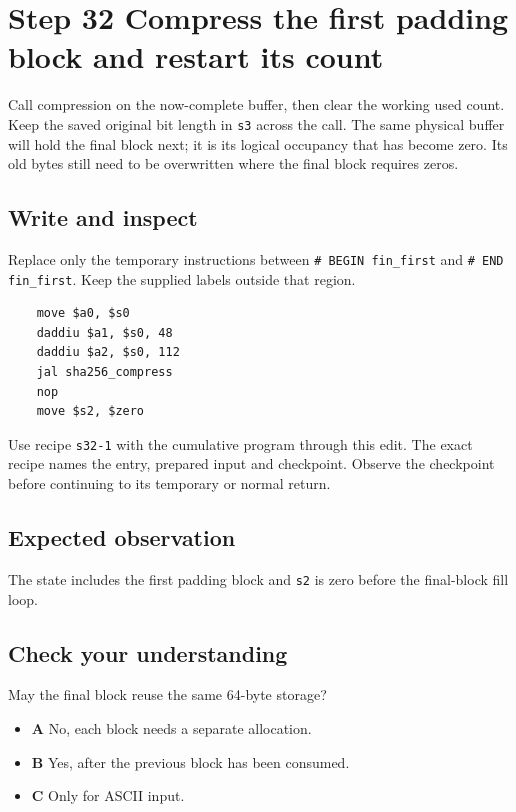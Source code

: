 \section{Step 32 Compress the first padding block and restart its count}\label{sha-s32}

Call compression on the now-complete buffer, then clear the working used count. Keep the saved original bit length in \texttt{s3} across the call. The same physical buffer will hold the final block next; it is its logical occupancy that has become zero. Its old bytes still need to be overwritten where the final block requires zeros.

\subsection{Write and inspect}
Replace only the temporary instructions between \texttt{\# BEGIN fin\_first} and \texttt{\# END fin\_first}. Keep the supplied labels outside that region.

\begin{verbatim}
    move $a0, $s0
    daddiu $a1, $s0, 48
    daddiu $a2, $s0, 112
    jal sha256_compress
    nop
    move $s2, $zero
\end{verbatim}

Use recipe \texttt{s32-1} with the cumulative program through this edit. The exact recipe names the entry, prepared input and checkpoint. Observe the checkpoint before continuing to its temporary or normal return.

\subsection{Expected observation}
The state includes the first padding block and \texttt{s2} is zero before the final-block fill loop.

\subsection{Check your understanding}
May the final block reuse the same 64-byte storage?

\begin{itemize}
\item \textbf{A} No, each block needs a separate allocation.
\item \textbf{B} Yes, after the previous block has been consumed.
\item \textbf{C} Only for ASCII input.
\end{itemize}
